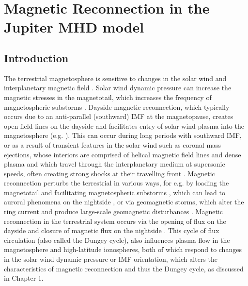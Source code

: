 \chapter{Magnetic Reconnection in the Jupiter MHD model}


\section{Introduction}
The terrestrial magnetosphere is sensitive to changes in the solar wind and interplanetary magnetic field \cite{Sibeck1991SolarMotion,McPherron2008ResponseWind}. Solar wind dynamic pressure can increase the magnetic stresses in the magnetotail, which increases the frequency of magnetospheric substorms \cite{Kokubun1977TriggeringDiscontinuities,Newell2011SolarTriggering,Newell2016SubstormSpeed}. Dayside magnetic reconnection, which typically occurs due to an anti-parallel (southward) IMF at the magnetopause, creates open field lines on the dayside and facilitates entry of solar wind plasma into the magnetosphere (e.g. ). This can occur during long periods with southward IMF, or as a result of transient features in the solar wind such as coronal mass ejections, whose interiors are comprised of helical magnetic field lines and dense plasma and which travel through the interplanetary medium at supersonic speeds, often creating strong shocks at their travelling front \cite{Webb2012CoronalObservations}. Magnetic reconnection perturbs the terrestrial in various ways, for e.g. by loading the magnetotail and facilitating magnetospheric substorms \cite{Morley2007OnOnsets}, which can lead to auroral phenomena on the nightside \cite{Elphinstone1996WhatSubstorm}, or via geomagnetic storms, which alter the ring current and produce large-scale geomagnetic disturbances \cite{Gonzalez1994WhatStorm}. Magnetic reconnection in the terrestrial system occurs via the opening of flux on the dayside and closure of magnetic flux on the nightside \cite{Dungey1961b}. This cycle of flux circulation (also called the Dungey cycle), also influences plasma flow in the magnetosphere and high-latitude ionospheres, both of which respond to changes in the solar wind dynamic pressure or IMF orientation, which alters the characteristics of magnetic reconnection and thus the Dungey cycle, as discussed in Chapter 1. 

